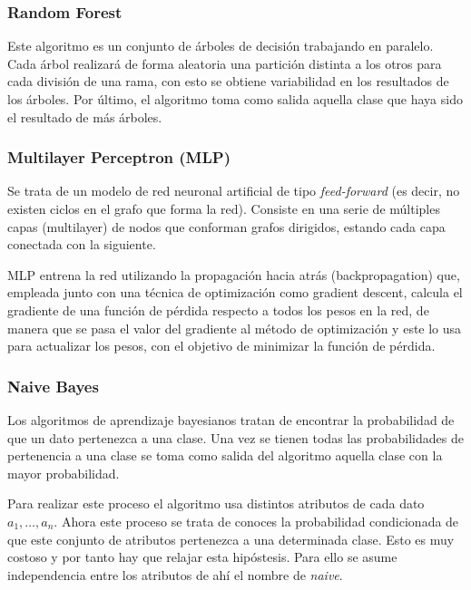 \subsubsection{Random Forest}

Este algoritmo es un conjunto de árboles de decisión trabajando en paralelo. Cada árbol realizará de forma aleatoria una partición distinta a los otros para cada división de una rama, con esto se obtiene variabilidad en los resultados de los árboles. Por último, el algoritmo toma como salida aquella clase que haya sido el resultado de más árboles.  \cite{hatwell2020chirps} \cite{breiman2001random}

\subsubsection{Multilayer Perceptron (MLP)}

Se trata de un modelo de red neuronal artificial de tipo \textit{feed-forward} (es decir, no existen ciclos en el grafo que forma la red). Consiste en una serie de múltiples capas (multilayer) de nodos que conforman grafos dirigidos, estando cada capa conectada con la siguiente. 

MLP entrena la red utilizando la propagación hacia atrás (backpropagation) que, empleada junto con una técnica de optimización como gradient descent, calcula el gradiente de una función de pérdida respecto a todos los pesos en la red, de manera que se pasa el valor del gradiente al método de optimización y este lo usa para actualizar los pesos, con el objetivo de minimizar la función de pérdida.

\subsubsection{Naive Bayes}

Los algoritmos de aprendizaje bayesianos tratan de encontrar la probabilidad de que un dato pertenezca a una clase. Una vez se tienen todas las probabilidades de pertenencia a una clase se toma como salida del algoritmo aquella clase con la mayor probabilidad.

Para realizar este proceso el algoritmo usa distintos atributos de cada dato $a_1, \dots, a_n$. Ahora este proceso se trata de conoces la probabilidad condicionada de que este conjunto de atributos pertenezca a una determinada clase. Esto es muy costoso y por tanto hay que relajar esta hipóstesis. Para ello se asume independencia entre los atributos de ahí el nombre de \textit{naive}.

